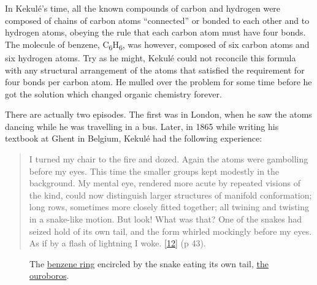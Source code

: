 \documentclass[
  a4paper,
]{article}
\begin{document}
In Kekulé's time, all the known compounds of carbon and hydrogen were
composed of chains of carbon atoms ``connected'' or bonded to each other
and to hydrogen atoms, obeying the rule that each carbon atom must have
four bonds. The molecule of benzene,
C\textsubscript{6}H\textsubscript{6}, was however, composed of six
carbon atoms and six hydrogen atoms. Try as he might, Kekulé could not
reconcile this formula with any structural arrangement of the atoms that
satisfied the requirement for four bonds per carbon atom. He mulled over
the problem for some time before he got the solution which changed
organic chemistry forever.

There are actually two episodes. The first was in London, when he saw
the atoms dancing while he was travelling in a bus. Later, in 1865 while
writing his textbook at Ghent in Belgium, Kekulé had the following
experience:

\begin{quote}
I turned my chair to the fire and dozed. Again the atoms were gambolling
before my eyes. This time the smaller groups kept modestly in the
background. My mental eye, rendered more acute by repeated visions of
the kind, could now distinguish larger structures of manifold
conformation; long rows, sometimes more closely fitted together; all
twining and twisting in a snake-like motion. But look! What was that?
One of the snakes had seized hold of its own tail, and the form whirled
mockingly before my eyes. As if by a flash of lightning I woke.
\protect\hyperlink{ref-findlay37}{{[}12{]}} (p 43).
\end{quote}

\begin{figure}
\hypertarget{fig:benzene}{%
\centering

\caption[The
\href{https://en.wikipedia.org/wiki/Benzene\#Structure}{benzene ring}
encircled by the snake eating its own tail,
\href{https://en.wikipedia.org/wiki/Ouroboros}{the ouroboros}.]{The
\href{https://en.wikipedia.org/wiki/Benzene\#Structure}{benzene ring}
encircled by the snake eating its own tail,
\href{https://en.wikipedia.org/wiki/Ouroboros}{the
ouroboros}.\footnotemark{}}\label{fig:benzene}
}
\end{figure}
\end{document}
